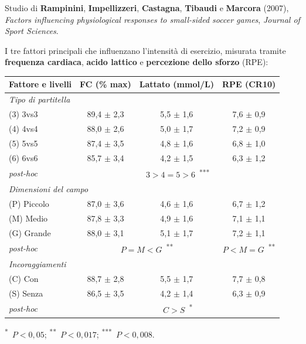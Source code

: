 Studio di \textbf{Rampinini}, \textbf{Impellizzeri}, \textbf{Castagna}, \textbf{Tibaudi} e
\textbf{Marcora} (2007), \textit{Factors influencing physiological responses to small-sided soccer
games}, \textit{Journal of Sport Sciences}.

I tre fattori principali che influenzano l'intensità di esercizio, misurata tramite
\textbf{frequenza cardiaca}, \textbf{acido lattico} e \textbf{percezione dello sforzo} (RPE):

\begin{table}[htbp]
  \centering
  \small
  \renewcommand{\arraystretch}{1.3}
  \begin{tabularx}{\textwidth}{|X|c|c|c|}
    \hline
    \textbf{Fattore e livelli} & \textbf{FC (\% max)} & \textbf{Lattato (mmol/L)} & \textbf{RPE (CR10)} \\
    \hline
    \multicolumn{4}{|l|}{\textit{Tipo di partitella}} \\
    \hline
    (3) 3vs3 & 89,4 $\pm$ 2,3 & 5,5 $\pm$ 1,6 & 7,6 $\pm$ 0,9 \\
    \hline
    (4) 4vs4 & 88,0 $\pm$ 2,6 & 5,0 $\pm$ 1,7 & 7,2 $\pm$ 0,9 \\
    \hline
    (5) 5vs5 & 87,4 $\pm$ 3,5 & 4,8 $\pm$ 1,6 & 6,8 $\pm$ 1,0 \\
    \hline
    (6) 6vs6 & 85,7 $\pm$ 3,4 & 4,2 $\pm$ 1,5 & 6,3 $\pm$ 1,2 \\
    \hline
    \textit{post-hoc} & \multicolumn{3}{c|}{$3 > 4 = 5 > 6$\ \textsuperscript{***}} \\
    \hline
    \multicolumn{4}{|l|}{\textit{Dimensioni del campo}} \\
    \hline
    (P) Piccolo & 87,0 $\pm$ 3,6 & 4,6 $\pm$ 1,6 & 6,7 $\pm$ 1,2 \\
    \hline
    (M) Medio & 87,8 $\pm$ 3,3 & 4,9 $\pm$ 1,6 & 7,1 $\pm$ 1,1 \\
    \hline
    (G) Grande & 88,0 $\pm$ 3,1 & 5,1 $\pm$ 1,7 & 7,2 $\pm$ 1,1 \\
    \hline
    \textit{post-hoc} & \multicolumn{2}{c|}{$P = M < G$\ \textsuperscript{**}} & $P < M = G$\ \textsuperscript{**} \\
    \hline
    \multicolumn{4}{|l|}{\textit{Incoraggiamenti}} \\
    \hline
    (C) Con & 88,7 $\pm$ 2,8 & 5,5 $\pm$ 1,7 & 7,7 $\pm$ 0,8 \\
    \hline
    (S) Senza & 86,5 $\pm$ 3,5 & 4,2 $\pm$ 1,4 & 6,3 $\pm$ 0,9 \\
    \hline
    \textit{post-hoc} & \multicolumn{3}{c|}{$C > S$\ \textsuperscript{*}} \\
    \hline
  \end{tabularx}

  \smallskip
  \footnotesize \textsuperscript{*}~$P < 0,05$; \textsuperscript{**}~$P < 0,017$;
  \textsuperscript{***}~$P < 0,008$.
\end{table}

